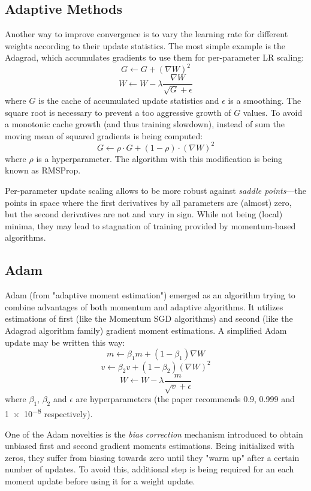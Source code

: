 \documentclass[thesis=B,english]{FITthesis}[2019/12/23]
\begin{document}
\subsection{Adaptive Methods}

Another way to improve convergence is to vary the learning rate for different weights according to their update statistics. The most simple example is the Adagrad\cite{adagrad}, which accumulates gradients to use them for per-parameter LR scaling:
\[G \longleftarrow G + (\nabla W)^2\]
\[W \longleftarrow W - \lambda \frac{\nabla W}{\sqrt{G} + \epsilon}\]
where $G$ is the cache of accumulated update statistics and $\epsilon$ is a smoothing. The square root is necessary to prevent a too aggressive growth of $G$ values. To avoid a monotonic cache growth (and thus training slowdown), instead of sum the moving mean of squared gradients is being computed:
\[G \longleftarrow \rho \cdot G + (1 - \rho) \cdot (\nabla W)^2\]
where $\rho$ is a hyperparameter. The algorithm with this modification is being known as RMSProp\cite{rmsprop}.

Per-parameter update scaling allows to be more robust against \textit{saddle points}---the points in space where the first derivatives by all parameters are (almost) zero, but the second derivatives are not and vary in sign. While not being (local) minima, they may lead to stagnation of training provided by momentum-based algorithms.

\subsection{Adam}

Adam\cite{adam} (from "adaptive moment estimation") emerged as an algorithm trying to combine advantages of both momentum and adaptive algorithms. It utilizes estimations of first (like the Momentum SGD algorithms) and second (like the Adagrad algorithm family) gradient moment estimations. A simplified Adam update may be written this way:
\[m \longleftarrow \beta_1 m + (1 - \beta_1) \nabla W\]
\[v \longleftarrow \beta_2 v + (1 - \beta_2) (\nabla W)^2\]
\[W \longleftarrow W - \lambda \frac{m}{\sqrt{v} + \epsilon}\]
where $\beta_1$, $\beta_2$ and $\epsilon$ are hyperparameters (the paper recommends 0.9, 0.999 and \num{1e-8} respectively).

One of the Adam novelties is the \textit{bias correction} mechanism introduced to obtain unbiased first and second gradient moments estimations. Being initialized with zeros, they suffer from biasing towards zero until they "warm up" after a certain number of updates. To avoid this, additional step is being required for an each moment update before using it for a weight update.
\end{document}
